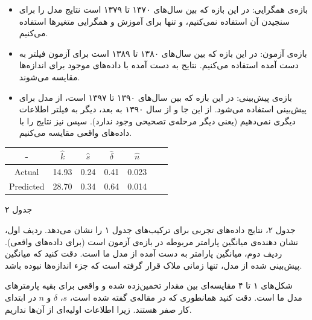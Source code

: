 \documentclass[11pt, fleqn]{article}
\begin{document}
\begin{multicols}{2}
\begin{itemize}
\item
بازه‌ی همگرایی: در این بازه که بین سال‌های ۱۳۷۰ تا ۱۳۷۹ است نتایج مدل را برای سنجیدن آن استفاده نمی‌کنیم، و تنها برای آموزش و همگرایی متغیر‌ها استفاده می‌کنیم.

\item
بازه‌ی آزمون: در این بازه که بین سال‌های ۱۳۸۰ تا ۱۳۸۹ است برای آزمون فیلتر به دست آمده استفاده می‌کنیم. نتایح به دست آمده با داده‌های موجود برای اندازه‌ها مقایسه می‌شوند. 
\item 
بازه‌ی پیش‌بینی: در این بازه که بین سال‌های ۱۳۹۰ تا ۱۳۹۷ است، از مدل برای پیش‌بینی استفاده می‌شود. از این جا و از سال ۱۳۹۰ به بعد، دیگر به فیلتر اطلاعات دیگری نمی‌دهیم (یعنی دیگر مرحله‌ی تصحیحی وجود ندارد).  سپس نیز نتایج را با داده‌های واقعی مقایسه می‌کنیم. 

\end{itemize}



\begin{latin}
\begin{tabular}{|c| c| c| c| c|c|c|} 
\hline 
- & $\hat{k}$ & $\hat{s}$ & $\hat{\delta}$ & $\hat{n}$ \\ [0.5ex]
\hline 
Actual 	  & 14.93 & 0.24 & 0.41 & 0.023 \\ 
Predicted & 28.70 & 0.34 & 0.64 & 0.014 \\
 [1ex] 
\hline 
\end{tabular}
\end{latin} 

\begin{center}
جدول ۲
\end{center}

 
جدول ۲، نتایج داده‌های تجربی برای ترکیب‌های جدول ۱ را نشان می‌دهد. ردیف اول، نشان دهنده‌ی میانگین پارامتر مربوطه در بازه‌ی آزمون است (برای داده‌های واقعی). ردیف دوم، میانگین پارامتر به دست آمده از مدل ما است. دقت کنید که میانگین پیش‌بینی شده از مدل، تنها زمانی ملاک قرار گرفته است که جزء اندازه‌ها نبوده باشد.


شکل‌های ۱ تا ۴ مقایسه‌ای بین مقدار تخمین‌زده شده و واقعی برای بقیه پارمتر‌های مدل ما است. دقت کنید  همانطوری که در مقاله‌ی
\cite{main}
  گفته شده است، $s$، 
  $\delta$
   و
   $n$
    در ابتدای کار صفر هستند. زیرا اطلاعات اولیه‌ای از آن‌ها نداریم.
    






\end{multicols}
\end{document}
